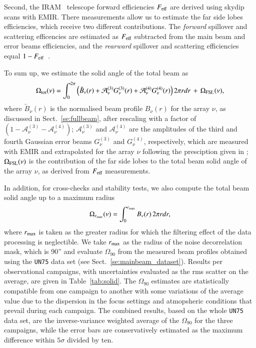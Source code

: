 {\rev Second, the IRAM \trentemetre\ telescope forward efficiencies
$F_{\rm{eff}}$ are derived using skydip scans with EMIR. There
measurements allow us to estimate the far side lobes efficiencies,
which receive two different contributions. The \emph{forward}
spillover and scattering efficencies are estimated as $F_{\rm{eff}}$
subtracted from the main beam and error beams efficiencies, and
the \emph{rearward} spillover and scattering efficiencies equal
$1-F_{\rm{eff}}$~\citep{Kramer2013}.}

{\rev To sum up, we estimate the solid angle of the total beam as
\begin{equation}
  \Omega_{\rm{tot}}(\nu) = \int_0^{2\pi} \left( \tilde{B}_{\nu}(r)
  + \mathcal{A}_{\nu}^{(3)} G_{\nu}^{(3)}(r) + \mathcal{A}_{\nu}^{(4)}
  G_{\nu}^{(4)}(r) \right)  2 \pi r dr  \, + \,  \Omega_{\rm{FSL}} (\nu),
  \label{eq:omega_tot}
\end{equation}
where $\tilde{B}_{\nu}(r)$ is the normalised beam profile $B_{\nu}(r)$
for the array $\nu$, as discussed in Sect.~\ref{se:fullbeam}, after
rescaling with a factor of
$(1-\mathcal{A}_{\nu}^{(3)}-\mathcal{A}_{\nu}^{(4)})$; 
$\mathcal{A}_{\nu}^{(3)}$ and $\mathcal{A}_{\nu}^{(4)}$ are the
amplitudes of the third and fourth Gaussian error beams
$G_{\nu}^{(3)}$ and $G_{\nu}^{(4)}$, respectively, which are measured
with EMIR and extrapolated for the array $\nu$ following the
presciption given in \citet{Kramer2013}; $\Omega_{\rm{FSL}} (\nu)$ is
the contribution of the far side lobes to the total beam solid angle
of the array $\nu$, as derived from $F_{\rm{eff}}$ measurements.}

{\rev In addition, for cross-checks and stability tests, we also compute the
total beam solid angle up to a maximum radius
\begin{equation}
 \Omega_{r_{\rm{max}}} (\nu) = \int_0^{r_{\rm max}} B_{\nu}(r)  \,  2 \pi r dr, 
\label{eq:omega_rmax}
\end{equation}
where $r_{\rm{max}}$ is taken as the greater radius for which the
filtering effect of the data processing is neglectible.
We take $r_{\rm{max}}$ as the radius of the noise decorrelation mask,
which is 90'' and evaluate {\rev $\Omega_{90}$} from the measured beam profiles
obtained using the {\tt UN75} data set (see Sect.~\ref{se:mainbeam_dataset}).
Results per observational campaigns, with uncertainties evaluated
as the rms scatter on the average, are given in
Table~\ref{tab:solid}. The $\Omega_{90}$ estimates are statistically
compatible from one campaign to another with some variations of the
average value due to the dispersion in the focus settings and
atmopsheric conditions that prevail during each campaign. The combined
results, based on the whole {\tt UN75} data set, are the
inverse-variance weighted average of the $\Omega_{90}$ for the three
campaigns, while the error bars are conservatively estimated as the
maximum difference within $5\sigma$ divided by ten.}
  
